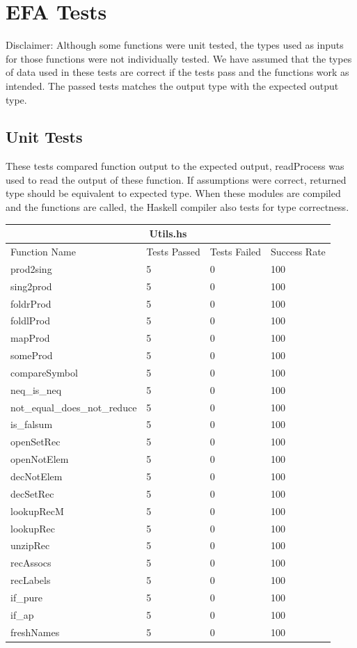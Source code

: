 \documentclass[12pt, svgnames]{article}
\begin{document}
\section{EFA Tests}
Disclaimer: Although some functions were unit tested, the types used as inputs 
for those functions were not individually tested. We have assumed that the 
types of data used in these tests are correct if the tests pass and the 
functions work as intended. The passed tests matches the output type with the 
expected output type.
\subsection{Unit Tests}
These tests compared function output to the expected output, readProcess was used 
to read the output of these function. If assumptions were correct, returned 
type should be equivalent to expected type. When these modules are compiled and 
the functions are called, the Haskell compiler also tests for type correctness. \\
\begin{adjustwidth}{-0.5cm}{}

\begin{tabular}[h!]{ |p{5cm}||p{3cm}|p{3cm}|p{3cm}|  }
    
    \hline
    \multicolumn{4}{|c|}{Utils.hs} \\
    \hline
    Function Name & Tests Passed & Tests Failed & Success Rate\\
    \hline
    prod2sing   & 5    &0&   100\\
    sing2prod&   5  & 0   &100\\
    foldrProd &5 & 0&  100\\
    foldlProd &5 & 0&  100\\
    mapProd&   5  & 0&100\\
    someProd& 5  & 0   &100\\
    compareSymbol& 5  & 0&100\\
    neq\_is\_neq& 5  & 0&100\\
    not\_equal\_does\_not\_reduce& 5  & 0&100\\
    is\_falsum& 5  & 0&100\\
    openSetRec& 5  & 0&100\\
    openNotElem& 5  & 0&100\\
    decNotElem& 5  & 0&100\\
    decSetRec& 5  & 0&100\\
    lookupRecM& 5  & 0&100\\
    lookupRec& 5  & 0&100\\
    unzipRec& 5  & 0&100\\
    recAssocs& 5  & 0&100\\
    recLabels& 5  & 0&100\\
    if\_pure& 5  & 0&100\\
    if\_ap& 5  & 0&100\\
    freshNames& 5  & 0 &100\\
    \hline
\end{tabular}

\end{adjustwidth}
\end{document}
